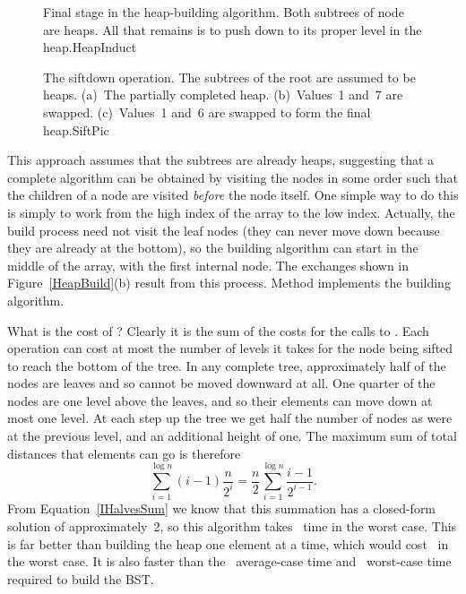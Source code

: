 \begin{figure}
\vspace{-\bigskipamount}
\vspace{-\smallskipamount}

{Final stage in the heap-building algorithm.
Both subtrees of node  are heaps.
All that remains is to push  down to its proper level in the
heap.}{HeapInduct}
\end{figure}

\begin{figure}

{The siftdown operation.
The subtrees of the root are assumed to be heaps.
(a)~The partially completed heap.
(b)~Values~1 and~7 are swapped.
(c)~Values~1 and~6 are swapped to form the final heap.}{SiftPic}
\medskip
\end{figure}

This approach assumes that the subtrees are already heaps,
suggesting that a complete algorithm can be obtained by visiting
the nodes in some order such that the children of a node are
visited \emph{before} the node itself.
One simple way to do this is simply to work from the high index of the 
array to the low index.
Actually, the build process need not visit the leaf nodes
(they can never move down because they are already at the bottom), so
the building algorithm can start in the middle of the array, with the
first internal node.
The exchanges shown in Figure~\ref{HeapBuild}(b) result from this
process.
Method  implements the building algorithm.


What is the cost of ?
Clearly it is the sum of the costs for the calls to
.
Each  operation can cost at most the number of levels
it takes for the node being sifted to reach the bottom of the tree.
In any complete tree, approximately half of the nodes are leaves
and so cannot be moved downward at all.
One quarter of the nodes are one level above the leaves, and so their
elements can move down at most one level.
At each step up the tree we get half the number of nodes as were at
the previous level, and an additional height of one.
The maximum sum of total distances that elements can go is
therefore
\[\sum_{i=1}^{\log n} (i-1)\frac{n}{2^i}
= \frac{n}{2}\sum_{i=1}^{\log n} \frac{i-1}{2^{i-1}}.\]
\noindent From Equation~\ref{IHalvesSum} we know that this summation
has a closed-form solution of approximately~2,
so this algorithm takes \Thetan\ time in the worst case.
This is far better than building the heap one element at a time, which
would cost \Thetanlogn\ in the worst case.
It is also faster than the \Thetanlogn\ average-case time and
\Thetantwo\ worst-case time required to build the
BST.

